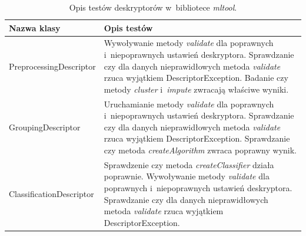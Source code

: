 \documentclass[../thesis.tex]{subfiles}
\begin{document}
\begin{table}[h]
\begin{center}
\begin{tabular}{ | l | p{110mm} | }
\hline
\rowcolor{lightgray} Nazwa klasy & Opis testów \\\hline

PreprocessingDescriptor & Wywoływanie metody \emph{validate} dla poprawnych i~niepoprawnych ustawień deskryptora. Sprawdzanie czy dla danych nieprawidłowych metoda \emph{validate} rzuca wyjątkiem DescriptorException. Badanie czy metody \emph{cluster} i~\emph{impute} zwracają właściwe wyniki.\\\hline
GroupingDescriptor & Uruchamianie metody \emph{validate} dla poprawnych i~niepoprawnych ustawień deskryptora. Sprawdzanie czy dla danych nieprawidłowych metoda \emph{validate} rzuca wyjątkiem DescriptorException. Sprawdzanie czy metoda \emph{createAlgorithm} zwraca poprawny wynik.\\\hline
ClassificationDescriptor & Sprawdzenie czy metoda \emph{createClassifier} działa poprawnie. Wywoływanie metody \emph{validate} dla poprawnych i~niepoprawnych ustawień deskryptora. Sprawdzanie czy dla danych nieprawidłowych metoda \emph{validate} rzuca wyjątkiem DescriptorException.\\\hline

\end{tabular}
\caption{Opis testów deskryptorów w~bibliotece \emph{mltool}.}
\label{proj:table_mltool_descriptors}
\end{center}
\end{table}
\end{document}
